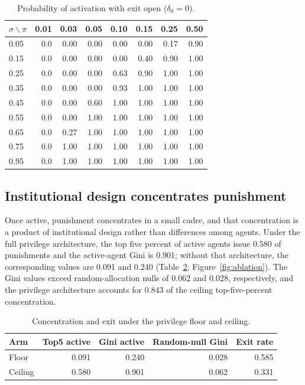 \documentclass[12pt]{article}
\begin{document}
\begin{table}[htbp]
\centering
\caption{Probability of activation with exit open ($\delta_0=0$).}
\label{tab:activation-frontier}
\begin{tabular}{lrrrrrrr}
\hline
$\sigma\backslash\pi$ & 0.01 & 0.03 & 0.05 & 0.10 & 0.15 & 0.25 & 0.50 \\
\hline
0.05 & 0.0 & 0.00 & 0.00 & 0.00 & 0.00 & 0.17 & 0.90 \\
0.15 & 0.0 & 0.00 & 0.00 & 0.00 & 0.40 & 0.90 & 1.00 \\
0.25 & 0.0 & 0.00 & 0.00 & 0.63 & 0.90 & 1.00 & 1.00 \\
0.35 & 0.0 & 0.00 & 0.00 & 0.93 & 1.00 & 1.00 & 1.00 \\
0.45 & 0.0 & 0.00 & 0.60 & 1.00 & 1.00 & 1.00 & 1.00 \\
0.55 & 0.0 & 0.00 & 1.00 & 1.00 & 1.00 & 1.00 & 1.00 \\
0.65 & 0.0 & 0.27 & 1.00 & 1.00 & 1.00 & 1.00 & 1.00 \\
0.75 & 0.0 & 1.00 & 1.00 & 1.00 & 1.00 & 1.00 & 1.00 \\
0.95 & 0.0 & 1.00 & 1.00 & 1.00 & 1.00 & 1.00 & 1.00 \\
\hline
\end{tabular}
\end{table}

\subsection{Institutional design concentrates punishment}

Once active, punishment concentrates in a small cadre, and that concentration is a product of institutional design rather than differences among agents. Under the full privilege architecture, the top five percent of active agents issue 0.580 of punishments and the active-agent Gini is 0.901; without that architecture, the corresponding values are 0.091 and 0.240 (Table~\ref{tab:privilege-ablation}; Figure~\ref{fig:ablation}). The Gini values exceed random-allocation nulls of 0.062 and 0.028, respectively, and the privilege architecture accounts for 0.843 of the ceiling top-five-percent concentration.

\begin{table}[htbp]
\centering
\caption{Concentration and exit under the privilege floor and ceiling.}
\label{tab:privilege-ablation}
\begin{tabular}{lrrrr}
\hline
Arm & Top5 active & Gini active & Random-null Gini & Exit rate \\
\hline
Floor & 0.091 & 0.240 & 0.028 & 0.585 \\
Ceiling & 0.580 & 0.901 & 0.062 & 0.331 \\
\hline
\end{tabular}
\end{table}
\end{document}

